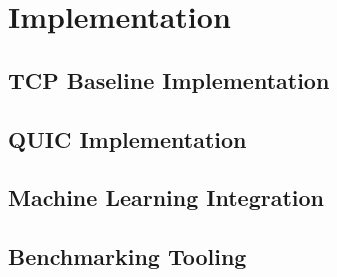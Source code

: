 \section{Implementation}
\subsection{TCP Baseline Implementation}
\subsection{QUIC Implementation}
\subsection{Machine Learning Integration}
\subsection{Benchmarking Tooling}
\clearpage